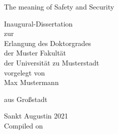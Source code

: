 

\begin{titlepage} %
\centering
\vspace*{3cm}   
{\huge The meaning of Safety and Security}
\vspace*{2cm}   

Inaugural-Dissertation\\[0.5cm]
zur\\[0.2cm]
Erlangung des Doktorgrades\\[0.2cm]
der Muster Fakultät\\[0.2cm]
der Universität zu Musterstadt \\[0.2cm]

vorgelegt von\\[0.5cm]


{\large Max Mustermann}

aus Großstadt\\

\vspace*{\fill}   

Sankt Augustin 2021 \\

Compiled on~\DTMnow 

\end{titlepage}
\restoregeometry

